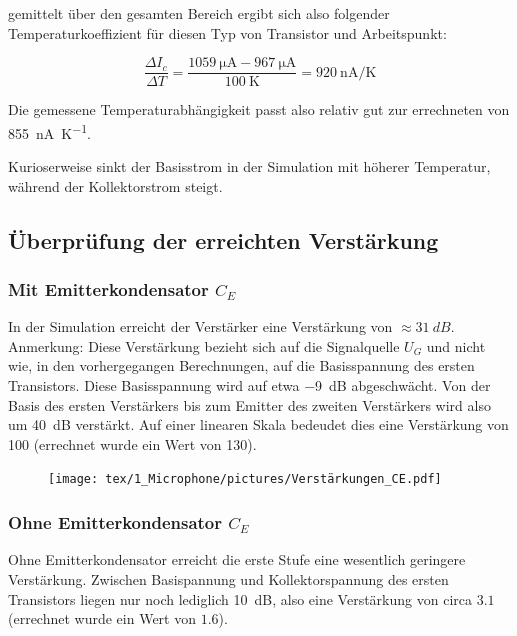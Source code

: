 gemittelt über den gesamten Bereich ergibt sich also folgender Temperaturkoeffizient für diesen Typ von Transistor und Arbeitspunkt:

\begin{equation*}
    \frac{\Delta I_{c}}{\Delta T} = \frac{\SI{1059}{\micro \ampere} - \SI{967}{\micro \ampere}}{\SI{100}{\kelvin}} = \SI{920}{\nano \ampere \per \kelvin}
\end{equation*}

Die \glqq gemessene \grqq{} Temperaturabhängigkeit passt also relativ gut zur errechneten von \SI{855}{\nano \ampere \per \kelvin}.

Kurioserweise sinkt der Basisstrom in der Simulation mit höherer Temperatur, während der Kollektorstrom steigt.

\subsection{Überprüfung der erreichten Verstärkung}

\subsubsection{Mit Emitterkondensator $C_E$}

In der Simulation erreicht der Verstärker eine Verstärkung von $\approx \SI{31}{dB}$. Anmerkung: Diese Verstärkung bezieht sich auf die Signalquelle $U_G$ und nicht wie, in den vorhergegangen Berechnungen, auf die Basisspannung des ersten Transistors. Diese Basisspannung wird auf etwa \SI{-9}{dB} abgeschwächt. Von der Basis des ersten Verstärkers bis zum Emitter des zweiten Verstärkers wird also um \SI{40}{dB} verstärkt.
Auf einer linearen Skala bedeudet dies eine Verstärkung von 100 (errechnet wurde ein Wert von 130).

\begin{figure}[H]
    \centering
    \texttt{[image: tex/1\_Microphone/pictures/Verstärkungen\_CE.pdf]}
    \label{fig:my_label}
\end{figure}

\subsubsection{Ohne Emitterkondensator $C_E$}

Ohne Emitterkondensator erreicht die erste Stufe eine wesentlich geringere Verstärkung. Zwischen Basispannung und Kollektorspannung des ersten Transistors liegen nur noch lediglich \SI{10}{dB}, also eine Verstärkung von circa $3.1$ (errechnet wurde ein Wert von $1.6$). 

